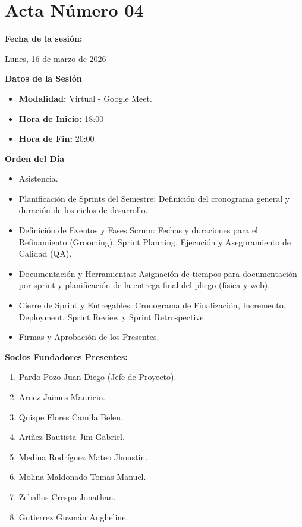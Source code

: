\newpage
\section{Acta Número 04}
\label{sec:acta04}

\noindent \textbf{Fecha de la sesión:}\par
Lunes, 16 de marzo de 2026

\vspace*{0.5cm}
\noindent \textbf{Datos de la Sesión}
\vspace{-0.2cm}
\begin{itemize}[noitemsep]
    \item \textbf{Modalidad:} Virtual - Google Meet.
    \item \textbf{Hora de Inicio:} 18:00
    \item \textbf{Hora de Fin:} 20:00
\end{itemize}

\vspace*{0.5cm}
\noindent \textbf{Orden del Día}
\vspace{-0.2cm}
\begin{itemize}[noitemsep]
    \item Asistencia.
    \item Planificación de Sprints del Semestre: Definición del cronograma general y duración de los ciclos de desarrollo.
    \item Definición de Eventos y Fases Scrum: Fechas y duraciones para el Refinamiento (Grooming), Sprint Planning, Ejecución y Aseguramiento de Calidad (QA).
    \item Documentación y Herramientas: Asignación de tiempos para documentación por sprint y planificación de la entrega final del pliego (física y web).
    \item Cierre de Sprint y Entregables: Cronograma de Finalización, Incremento, Deployment, Sprint Review y Sprint Retrospective.
    \item Firmas y Aprobación de los Presentes.
\end{itemize}

\vspace*{0.5cm}
\noindent \textbf{Socios Fundadores Presentes:}
\vspace{-0.2cm}
\begin{enumerate}[noitemsep]
    \item Pardo Pozo Juan Diego (Jefe de Proyecto).
    \item Arnez Jaimes Mauricio.
    \item Quispe Flores Camila Belen.
    \item Ariñez Bautista Jim Gabriel.
    \item Medina Rodríguez Mateo Jhoustin.
    \item Molina Maldonado Tomas Manuel.
    \item Zeballos Crespo Jonathan.
    \item Gutierrez Guzmán Angheline.
\end{enumerate}

